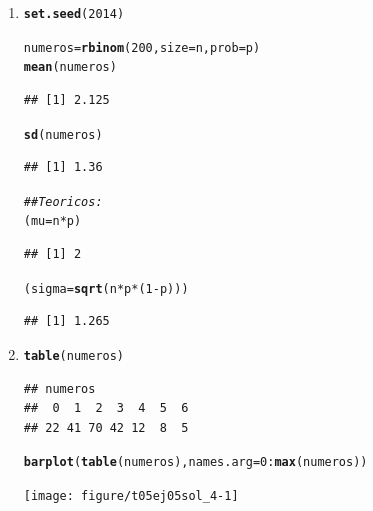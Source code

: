 \documentclass[10pt,a4paper]{article}\usepackage[]{graphicx}\usepackage[]{color}
\makeatletter
\newcommand{\hlnum}[1]{\textcolor[rgb]{0.686,0.059,0.569}{#1}}%
\newcommand{\hlcom}[1]{\textcolor[rgb]{0.678,0.584,0.686}{\textit{#1}}}%
\newcommand{\hlopt}[1]{\textcolor[rgb]{0,0,0}{#1}}%
\newcommand{\hlstd}[1]{\textcolor[rgb]{0.345,0.345,0.345}{#1}}%
\newcommand{\hlkwb}[1]{\textcolor[rgb]{0.69,0.353,0.396}{#1}}%
\newcommand{\hlkwc}[1]{\textcolor[rgb]{0.333,0.667,0.333}{#1}}%
\newcommand{\hlkwd}[1]{\textcolor[rgb]{0.737,0.353,0.396}{\textbf{#1}}}%
\newenvironment{kframe}{%
 \def\at@end@of@kframe{}%
 \ifinner\ifhmode%
  \def\at@end@of@kframe{\end{minipage}}%
  \begin{minipage}{\columnwidth}%
 \fi\fi%
 \def\FrameCommand##1{\hskip\@totalleftmargin \hskip-\fboxsep
 \colorbox{shadecolor}{##1}\hskip-\fboxsep
     \hskip-\linewidth \hskip-\@totalleftmargin \hskip\columnwidth}%
 \MakeFramed {\advance\hsize-\width
   \@totalleftmargin\z@ \linewidth\hsize
   \@setminipage}}%
 {\par\unskip\endMakeFramed%
 \at@end@of@kframe}
\newenvironment{knitrout}{}{} %
\makeatother
\begin{document}
\begin{enumerate}
  \item
\begin{knitrout}
\color{fgcolor}\begin{kframe}
\begin{alltt}
\hlkwd{set.seed}\hlstd{(}\hlnum{2014}\hlstd{)}

\hlstd{numeros} \hlkwb{=} \hlkwd{rbinom}\hlstd{(}\hlnum{200}\hlstd{,} \hlkwc{size}\hlstd{=n,} \hlkwc{prob}\hlstd{= p)}
\hlkwd{mean}\hlstd{(numeros)}
\end{alltt}
\begin{verbatim}
## [1] 2.125
\end{verbatim}
\begin{alltt}
\hlkwd{sd}\hlstd{(numeros)}
\end{alltt}
\begin{verbatim}
## [1] 1.36
\end{verbatim}
\begin{alltt}
\hlcom{## Teoricos:}
\hlstd{(mu} \hlkwb{=} \hlstd{n} \hlopt{*} \hlstd{p)}
\end{alltt}
\begin{verbatim}
## [1] 2
\end{verbatim}
\begin{alltt}
\hlstd{(sigma} \hlkwb{=} \hlkwd{sqrt} \hlstd{(n} \hlopt{*} \hlstd{p} \hlopt{*} \hlstd{(}\hlnum{1} \hlopt{-} \hlstd{p)))}
\end{alltt}
\begin{verbatim}
## [1] 1.265
\end{verbatim}
\end{kframe}
\end{knitrout}

  \item
\begin{knitrout}
\color{fgcolor}\begin{kframe}
\begin{alltt}
\hlkwd{table}\hlstd{(numeros)}
\end{alltt}
\begin{verbatim}
## numeros
##  0  1  2  3  4  5  6 
## 22 41 70 42 12  8  5
\end{verbatim}
\begin{alltt}
\hlkwd{barplot}\hlstd{(}\hlkwd{table}\hlstd{(numeros),} \hlkwc{names.arg} \hlstd{=} \hlnum{0}\hlopt{:}\hlkwd{max}\hlstd{(numeros))}
\end{alltt}
\end{kframe}
\texttt{[image: figure/t05ej05sol\_4-1]} 


\end{knitrout}
\end{enumerate}
\end{document}
